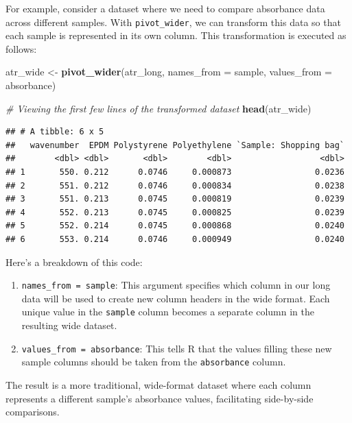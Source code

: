 \documentclass[
]{book}
\newenvironment{Shaded}{\begin{snugshade}}{\end{snugshade}}
\newcommand{\AttributeTok}[1]{\textcolor[rgb]{0.13,0.29,0.53}{#1}}
\newcommand{\CommentTok}[1]{\textcolor[rgb]{0.56,0.35,0.01}{\textit{#1}}}
\newcommand{\FunctionTok}[1]{\textcolor[rgb]{0.13,0.29,0.53}{\textbf{#1}}}
\newcommand{\NormalTok}[1]{#1}
\newcommand{\OtherTok}[1]{\textcolor[rgb]{0.56,0.35,0.01}{#1}}
\providecommand{\tightlist}{%
  \setlength{\itemsep}{0pt}\setlength{\parskip}{0pt}}
\begin{document}
For example, consider a dataset where we need to compare absorbance data across different samples. With \texttt{pivot\_wider}, we can transform this data so that each sample is represented in its own column. This transformation is executed as follows:

\begin{Shaded}
\begin{Highlighting}[]
\NormalTok{atr\_wide }\OtherTok{\textless{}{-}} \FunctionTok{pivot\_wider}\NormalTok{(atr\_long, }
                        \AttributeTok{names\_from =}\NormalTok{ sample, }
                        \AttributeTok{values\_from =}\NormalTok{ absorbance)}

\CommentTok{\# Viewing the first few lines of the transformed dataset}
\FunctionTok{head}\NormalTok{(atr\_wide)}
\end{Highlighting}
\end{Shaded}

\begin{verbatim}
## # A tibble: 6 x 5
##   wavenumber  EPDM Polystyrene Polyethylene `Sample: Shopping bag`
##        <dbl> <dbl>       <dbl>        <dbl>                  <dbl>
## 1       550. 0.212      0.0746     0.000873                 0.0236
## 2       551. 0.212      0.0746     0.000834                 0.0238
## 3       551. 0.213      0.0745     0.000819                 0.0239
## 4       552. 0.213      0.0745     0.000825                 0.0239
## 5       552. 0.214      0.0745     0.000868                 0.0240
## 6       553. 0.214      0.0746     0.000949                 0.0240
\end{verbatim}

Here's a breakdown of this code:

\begin{enumerate}
\def\labelenumi{\arabic{enumi}.}
\tightlist
\item
  \texttt{names\_from\ =\ sample}: This argument specifies which column in our long data will be used to create new column headers in the wide format. Each unique value in the \texttt{sample} column becomes a separate column in the resulting wide dataset.
\item
  \texttt{values\_from\ =\ absorbance}: This tells R that the values filling these new sample columns should be taken from the \texttt{absorbance} column.
\end{enumerate}

The result is a more traditional, wide-format dataset where each column represents a different sample's absorbance values, facilitating side-by-side comparisons.
\end{document}
